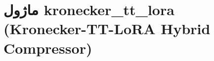 \section{ماژول kronecker\_tt\_lora (Kronecker-TT-LoRA Hybrid Compressor)}
\label{sec:module_kronecker_tt_lora}
